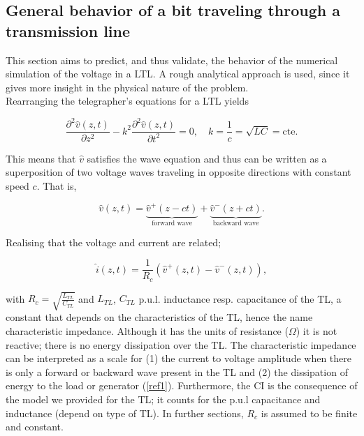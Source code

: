 

\subsection{General behavior of a bit traveling through a transmission line}\label{gbh}
This section aims to predict, and thus validate, the behavior of the numerical simulation of the voltage in a LTL. A rough analytical approach is used, since it gives more insight in the physical nature of the problem.  \\

Rearranging the telegrapher's equations for a LTL yields

\begin{equation}
\frac{\partial^2\hat{v}(z, t)}{\partial z^2} - k^2\frac{\partial^2 \hat{v}(z, t)}{\partial t^2} = 0, \quad k = \frac{1}{c}= \sqrt{LC} = \mathrm{cte}.
\label{tele}
\end{equation}

This means that $\hat{v}$ satisfies the wave equation and thus can be written as a superposition of two voltage waves traveling in opposite directions with constant speed $c$. That is,

\begin{equation}
\hat{v}(z, t) = \underbrace{\hat{v}^{+}(z - ct)}_{\text{forward wave}} + \underbrace{\hat{v}^{-}(z + ct)}_{\text{backward wave}}.
\end{equation}

Realising that the voltage and current are related;

\begin{equation}
\hat{i}(z, t) = \frac{1}{R_c}(\hat{v}^{+}(z, t) - \hat{v}^{-}(z, t)),
\end{equation}

with $R_c = \sqrt{\frac{L_{TL}}{C_{TL}}}$ and $L_{TL}$, $C_{TL}$ p.u.l. inductance resp. capacitance of the TL, a constant that depends on the characteristics of the TL, hence the name characteristic impedance. Although it has the units of resistance ($\Omega$) it is not reactive; there is no energy dissipation over the TL. The characteristic impedance can be interpreted as a scale for (1) the current to voltage amplitude when there is only a forward or backward wave present in the TL and (2) the dissipation of energy to the load or generator (\ref{ref1}). Furthermore, the CI is the consequence of the model we provided for the TL; it counts for the p.u.l capacitance and inductance (depend on type of TL). In further sections, $R_c$ is assumed to be finite and constant.
